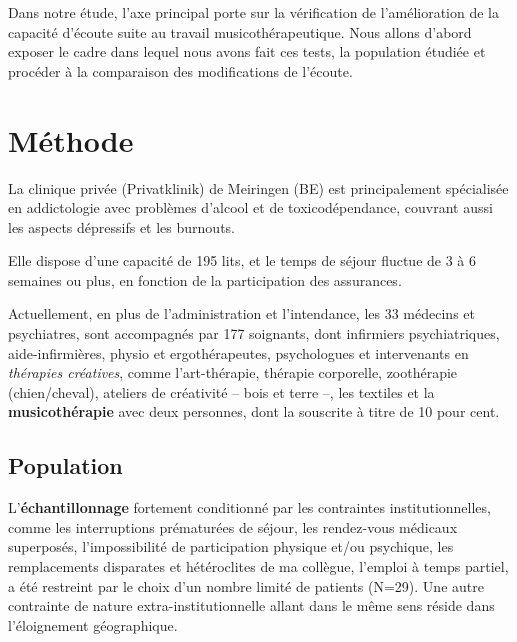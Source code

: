
Dans notre étude, l'axe principal porte sur la
vérification de l'amélioration de
la capacité d'écoute suite au travail musicothérapeutique.
Nous allons
d'abord exposer le cadre dans lequel nous avons fait ces tests, la
population étudiée et procéder à la comparaison des modifications de
l'écoute.

\section{Méthode}

 La clinique privée (Privatklinik)
de Meiringen (BE) est  principalement spécialisée en
addictologie avec problèmes d'alcool et de toxicodépendance, couvrant aussi les aspects dépressifs
et les
burnouts.


Elle dispose d'une capacité de 195 lits, et le temps de séjour fluctue de 3 à 6 semaines ou plus, en
fonction de la participation des assurances.

Actuellement, en plus de l'administration et l'intendance, les 33
médecins et psychiatres, sont
accompagnés par 177
soignants, dont infirmiers psychiatriques, aide-infirmières, physio et
ergothérapeutes, 
psychologues et intervenants en \textit{thérapies
créatives}, comme l'art-thérapie, thérapie
corporelle, zoothérapie (chien/cheval),  ateliers de créativité --
bois et terre --,  les textiles et la\textbf{ musicothérapie} avec deux
personnes, dont la souscrite à titre de 10 pour cent.








\subsection{Population}
L'\textbf{échantillonnage} fortement conditionné par les contraintes
institutionnelles, comme les interruptions prématurées de séjour, les rendez-vous
 médicaux superposés, l'impossibilité de participation physique et/ou
 psychique, les remplacements disparates et hétéroclites de ma
 collègue, l'emploi à
 temps partiel, a été restreint  par le choix d'un nombre limité de
 patients (N=29).
Une autre contrainte de nature extra-institutionnelle allant dans le
même sens réside dans l'éloignement géographique.

